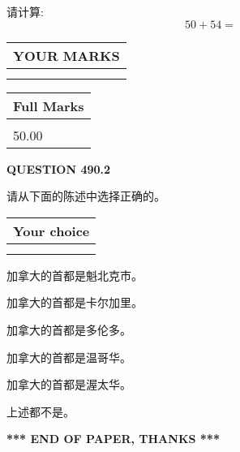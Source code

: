 \documentclass{ctexart}
\begin{document}
  
 
请计算:
\begin{equation}
50 +  %
54 = \nonumber
\end{equation}
 

 

 
  
\vspace{0.2in}
  
\noindent\begin{tabular}{|l|}
\hline
 YOUR MARKS  \\
\hline
 \\ 
 \\ 
\hline
\end{tabular}
\hspace{0.05in} \begin{tabular}{|l|}
\hline
 Full Marks  \\
\hline
 \\ 
50.00 \\
\hline
\end{tabular}
{\textbf{\Large{QUESTION
490.2 
}}}
  
  
请从下面的陈述中选择正确的。
  
  
\noindent\hspace{3.0in} \begin{tabular}{|l|}
\hline
Your choice \\
\hline
 \\ 
 \\ 
\hline
\end{tabular}
  
  
 
 
加拿大的首都是魁北克市。
 
 
加拿大的首都是卡尔加里。
 
 
加拿大的首都是多伦多。
 
 
加拿大的首都是温哥华。
 
 
加拿大的首都是渥太华。
 
 
 上述都不是。
 
 
   
   
 \vspace{0.2in}
 
   
   
   
   
\vspace{1.0in} 
{\textbf{\large{ *** END OF PAPER, THANKS *** }}} 
   
\end{document}
